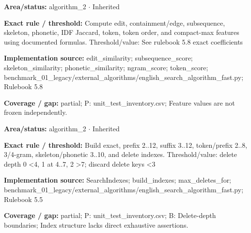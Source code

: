 \begin{tcolorbox}[enhanced,breakable,colback=white,colframe=Muted!45,boxrule=0.45pt,arc=1.5pt,left=6pt,right=6pt,top=5pt,bottom=5pt,title={\texttt{A2-FEATURES-10}},title after break={\texttt{A2-FEATURES-10}\ (continued)},fonttitle=\headingfont\bfseries\color{Navy},coltitle=Navy]
\textbf{Area/status:} algorithm\_\allowbreak{}2 $\boldsymbol{\cdot}$ Inherited\par
\smallskip
\textbf{Exact rule / threshold:} Compute edit, containment/\allowbreak{}edge, subsequence, skeleton, phonetic, IDF Jaccard, token, token order, and compact-max features using documented formulas. Threshold/\allowbreak{}value: See rulebook 5.8 exact coefficients\par
\smallskip
\textbf{Implementation source:} edit\_\allowbreak{}similarity; subsequence\_\allowbreak{}score; skeleton\_\allowbreak{}similarity; phonetic\_\allowbreak{}similarity; ngram\_\allowbreak{}score; token\_\allowbreak{}score; benchmark\_\allowbreak{}01\_\allowbreak{}legacy/\allowbreak{}external\_\allowbreak{}algorithms/\allowbreak{}english\_\allowbreak{}search\_\allowbreak{}algorithm\_\allowbreak{}fast.py; Rulebook 5.8\par
\smallskip
\textbf{Coverage / gap:} partial; P: unit\_\allowbreak{}test\_\allowbreak{}inventory.csv; Feature values are not frozen independently.
\end{tcolorbox}
\begin{tcolorbox}[enhanced,breakable,colback=white,colframe=Muted!45,boxrule=0.45pt,arc=1.5pt,left=6pt,right=6pt,top=5pt,bottom=5pt,title={\texttt{A2-INDEXES-07}},title after break={\texttt{A2-INDEXES-07}\ (continued)},fonttitle=\headingfont\bfseries\color{Navy},coltitle=Navy]
\textbf{Area/status:} algorithm\_\allowbreak{}2 $\boldsymbol{\cdot}$ Inherited\par
\smallskip
\textbf{Exact rule / threshold:} Build exact, prefix 2..12, suffix 3..12, token/\allowbreak{}prefix 2..8, 3/\allowbreak{}4-gram, skeleton/\allowbreak{}phonetic 3..10, and delete indexes. Threshold/\allowbreak{}value: delete depth 0 <4, 1 at 4..7, 2 >7; discard delete keys <3\par
\smallskip
\textbf{Implementation source:} SearchIndexes; build\_\allowbreak{}indexes; max\_\allowbreak{}deletes\_\allowbreak{}for; benchmark\_\allowbreak{}01\_\allowbreak{}legacy/\allowbreak{}external\_\allowbreak{}algorithms/\allowbreak{}english\_\allowbreak{}search\_\allowbreak{}algorithm\_\allowbreak{}fast.py; Rulebook 5.5\par
\smallskip
\textbf{Coverage / gap:} partial; P: unit\_\allowbreak{}test\_\allowbreak{}inventory.csv; B: Delete-depth boundaries; Index structure lacks direct exhaustive assertions.
\end{tcolorbox}
